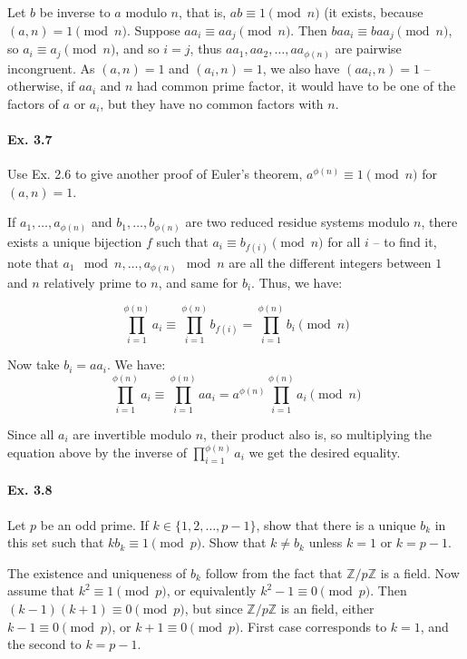 \documentclass[notitlepage]{article}
\theoremstyle{definition}
\newcommand\Z{\mathbb{Z}}
\begin{document}
Let $b$ be inverse to $a$ modulo $n$, that is, $ab \equiv 1 \pmod n$
(it exists, because $(a, n) = 1 \pmod n$. Suppose $aa_i \equiv aa_j
\pmod n$. Then $ba a_i \equiv baa_j \pmod n$, so $a_i \equiv a_j \pmod
n$, and so $i = j$, thus $aa_1, aa_2, \ldots, aa_{\phi(n)}$ are
pairwise incongruent. As $(a,n) = 1$ and $(a_i, n) = 1$, we also have
$(aa_i, n) = 1$ -- otherwise, if $aa_i$ and $n$ had common prime
factor, it would have to be one of the factors of $a$ or $a_i$, but
they have no common factors with $n$.

\paragraph{Ex. 3.7}
Use Ex. 2.6 to give another proof of Euler's theorem, $a^{\phi(n)}
\equiv 1 \pmod n$ for $(a, n) = 1$.

If $a_1, \ldots, a_{\phi(n)}$ and $b_1, \ldots, b_{\phi(n)}$ are two
reduced residue systems modulo $n$, there exists a unique bijection
$f$ such that $a_i \equiv b_{f(i)} \pmod n$ for all $i$ -- to find it,
note that $a_1 \mod n, \ldots, a_{\phi(n)} \mod n$ are all the
different integers between $1$ and $n$ relatively prime to $n$, and
same for $b_i$. Thus, we have:

\begin{equation}
  \prod_{i=1}^{\phi(n)} a_i \equiv \prod_{i=1}^{\phi(n)} b_{f(i)} = \prod_{i=1}^{\phi(n)} b_{i} \pmod n
\end{equation}

Now take $b_i = a a_i$. We have:
\begin{equation}
  \prod_{i=1}^{\phi(n)} a_i \equiv \prod_{i=1}^{\phi(n)} aa_i = a^{\phi(n)} \prod_{i=1}^{\phi(n)} a_i\pmod n
\end{equation}

Since all $a_i$ are invertible modulo $n$, their product also is, so
multiplying the equation above by the inverse of
$\prod_{i=1}^{\phi(n)} a_i$ we get the desired equality.

\paragraph{Ex. 3.8}
Let $p$ be an odd prime. If $k \in \{1, 2, \ldots, p - 1\}$, show that
there is a unique $b_k$ in this set such that $kb_k \equiv 1 \pmod
p$. Show that $k \ne b_k$ unless $k = 1$ or $k = p - 1$.

The existence and uniqueness of $b_k$ follow from the fact that
$\Z/p\Z$ is a field. Now assume that $k^2 \equiv 1 \pmod p$, or
equivalently $k^2 - 1 \equiv 0 \pmod p$. Then $(k-1)(k+1) \equiv 0
\pmod p$, but since $\Z/p\Z$ is an field, either $k-1 \equiv 0 \pmod
p$, or $k+1 \equiv 0 \pmod p$. First case corresponds to $k = 1$, and
the second to $k = p-1$.
\end{document}
